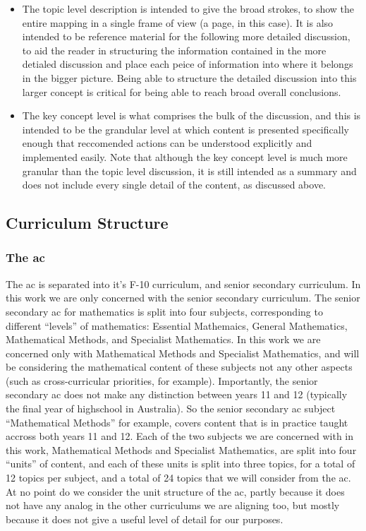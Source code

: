 \documentclass[twoside,12pt,a4paper]{report}
\begin{document}
\begin{itemize}
	\item The topic level description is intended to give the broad strokes, to show the entire mapping in a single frame of view (a page, in this case). It is also intended to be reference material for the following more detailed discussion, to aid the reader in structuring the information contained in the more detialed discussion and place each peice of information into where it belongs in the bigger picture. Being able to structure the detailed discussion into this larger concept is critical for being able to reach broad overall conclusions.
	\item The key concept level is what comprises the bulk of the discussion, and this is intended to be the grandular level at which content is presented specifically enough that reccomended actions can be understood explicitly and implemented easily. Note that although the key concept level is much more granular than the topic level discussion, it is still intended as a summary and does not include every single detail of the content, as discussed above.
\end{itemize}



\subsection{Curriculum Structure}
\label{sec:structure}

\subsubsection{The \gls{ac}}

The \gls{ac} is separated into it's F-10 curriculum, and senior secondary curriculum. In this work we are only concerned with the senior secondary curriculum. The senior secondary \gls{ac} for mathematics is split into four subjects, corresponding to different ``levels'' of mathematics: Essential Mathemaics, General Mathematics, Mathematical Methods, and Specialist Mathematics. In this work we are concerned only with Mathematical Methods and Specialist Mathematics, and will be considering the mathematical content of these subjects not any other aspects (such as cross-curricular priorities, for example). Importantly, the senior secondary \gls{ac} does not make any distinction between years 11 and 12 (typically the final year of highschool in Australia). So the senior secondary \gls{ac} subject ``Mathematical Methods'' for example, covers content that is in practice taught accross both years 11 and 12. Each of the two subjects we are concerned with in this work, Mathematical Methods and Specialist Mathematics, are split into four ``units'' of content, and each of these units is split into three topics, for a total of 12 topics per subject, and a total of 24 topics that we will consider from the \gls{ac}. At no point do we consider the unit structure of the \gls{ac}, partly because it does not have any analog in the other curriculums we are aligning too, but mostly because it does not give a useful level of detail for our purposes.
\end{document}
